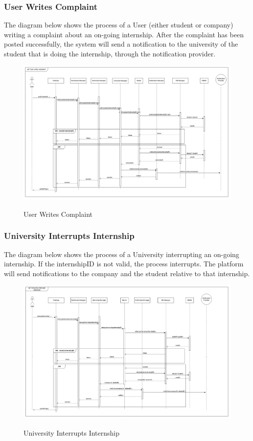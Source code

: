 \documentclass[a4paper,12pt]{article}
\begin{document}
\newpage

\subsubsection*{User Writes Complaint}
The diagram below shows the process of a User (either student or company) writing a complaint about an on-going internship. After the complaint has been posted successfully, the system will send a notification to the university of the student that is doing the internship, through the notification provider.
\begin{figure}[H]
\centering
\includegraphics[scale = 0.4]{DD_figures/RuntimeView/UserWritesComplaintRV.png}\\
\caption{User Writes Complaint}
\end{figure}

\newpage

\subsubsection*{University Interrupts Internship}
The diagram below shows the process of a University interrupting an on-going internship. If the internshipID is not valid, the process interrupts. The platform will send notifications to the company and the student relative to that internship.
\begin{figure}[H]
\centering
\includegraphics[scale = 0.4]{DD_figures/RuntimeView/UniversityInterruptsInternshipRV.png}\\
\caption{University Interrupts Internship}
\end{figure}
\end{document}
